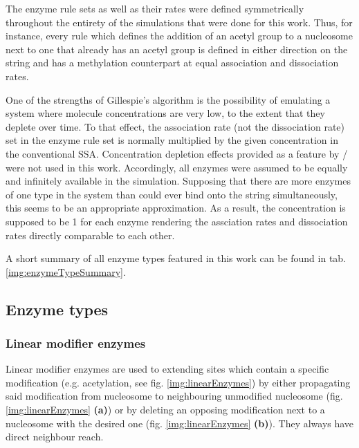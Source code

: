         The enzyme rule sets as well as their rates were defined symmetrically throughout the entirety of the simulations that were done for this work. Thus, for instance, every rule which defines the addition of an acetyl group to a nucleosome next to one that already has an acetyl group is defined in either direction on the string and has a methylation counterpart at equal association and dissociation rates.

        One of the strengths of Gillespie's algorithm is the possibility of emulating a system where molecule concentrations are very low, to the extent that they deplete over time. To that effect, the association rate (not the dissociation rate) set in the enzyme rule set is normally multiplied by the given concentration in the conventional SSA. Concentration depletion effects provided as a feature by \ed/ were not used in this work. Accordingly, all enzymes were assumed to be equally and infinitely available in the simulation. Supposing that there are more enzymes of one type in the system than could ever bind onto the string simultaneously, this seems to be an appropriate approximation. As a result, the concentration is supposed to be 1 for each enzyme rendering the assciation rates and dissociation rates directly comparable to each other.

        A short summary of all enzyme types featured in this work can be found in tab. \ref{img:enzymeTypeSummary}.

        \subsection{Enzyme types}

            \subsubsection{Linear modifier enzymes}

                Linear modifier enzymes are used to extending sites which contain a specific modification (e.g. acetylation, see fig. \ref{img:linearEnzymes}) by either propagating said modification from nucleosome to neighbouring unmodified nucleosome (fig. \ref{img:linearEnzymes} \textbf{(a)}) or by deleting an opposing modification next to a nucleosome with the desired one (fig. \ref{img:linearEnzymes} \textbf{(b)}). They always have direct neighbour reach.

